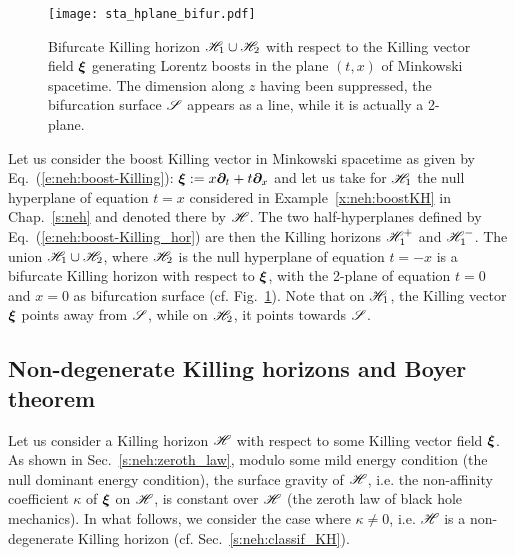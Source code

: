 \begin{figure}
\centerline{\texttt{[image: sta\_hplane\_bifur.pdf]}}
\caption[]{\label{f:sta:hplane_bifur} \footnotesize
Bifurcate Killing horizon $\mathscr{H}_1\cup\mathscr{H}_2$ with respect to the Killing vector
field $\bm{\xi}$ generating Lorentz boosts in the plane $(t,x)$ of Minkowski
spacetime. The dimension along $z$ having been suppressed, the bifurcation
surface $\mathscr{S}$ appears as a line, while it is actually a 2-plane.}
\end{figure}

\begin{example}
\label{x:sta:bif-KH-boost}
Let us consider the boost Killing vector in Minkowski spacetime as given
by Eq.~(\ref{e:neh:boost-Killing}): $\bm{\xi} := x \bm{\partial}_t + t \bm{\partial}_x$
and let us take for $\mathscr{H}_1$ the null hyperplane of equation $t=x$
considered in Example~\ref{x:neh:boostKH} in Chap.~\ref{s:neh} and denoted there
by $\mathscr{H}$. The two half-hyperplanes defined by
Eq.~(\ref{e:neh:boost-Killing_hor}) are then the Killing horizons $\mathscr{H}_1^+$ and
$\mathscr{H}_1^-$. The union $\mathscr{H}_1 \cup \mathscr{H}_2$, where $\mathscr{H}_2$ is the null hyperplane of equation $t=-x$ is a bifurcate Killing horizon with respect to $\bm{\xi}$,
with the 2-plane of equation $t=0$ and $x=0$ as bifurcation surface
(cf. Fig.~\ref{f:sta:hplane_bifur}). Note that on $\mathscr{H}_1$, the Killing vector
$\bm{\xi}$ points away from $\mathscr{S}$, while on $\mathscr{H}_2$, it points towards $\mathscr{S}$.
\end{example}

\subsection{Non-degenerate Killing horizons and Boyer theorem}
\label{s:sta:non-degenerate_KH}

Let us consider a Killing horizon $\mathscr{H}$ with respect to some Killing vector
field $\bm{\xi}$. As shown in Sec.~\ref{s:neh:zeroth_law},
modulo some mild energy condition (the null dominant energy condition),
the surface gravity of $\mathscr{H}$, i.e.
the non-affinity coefficient $\kappa$ of $\bm{\xi}$ on $\mathscr{H}$, is constant over
$\mathscr{H}$ (the zeroth law of black hole mechanics).
In what follows, we consider the case where $\kappa\not=0$, i.e. $\mathscr{H}$
is a non-degenerate Killing horizon (cf. Sec.~\ref{s:neh:classif_KH}).

